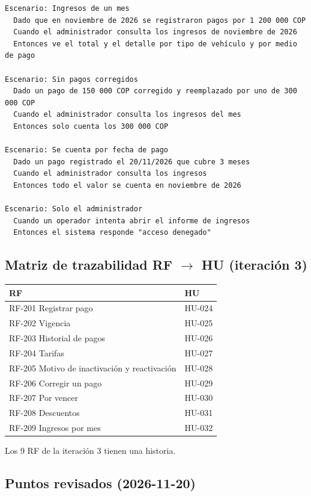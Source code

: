 \begin{lstlisting}[style=gherkin]
Escenario: Ingresos de un mes
  Dado que en noviembre de 2026 se registraron pagos por 1 200 000 COP
  Cuando el administrador consulta los ingresos de noviembre de 2026
  Entonces ve el total y el detalle por tipo de vehículo y por medio de pago

Escenario: Sin pagos corregidos
  Dado un pago de 150 000 COP corregido y reemplazado por uno de 300 000 COP
  Cuando el administrador consulta los ingresos del mes
  Entonces solo cuenta los 300 000 COP

Escenario: Se cuenta por fecha de pago
  Dado un pago registrado el 20/11/2026 que cubre 3 meses
  Cuando el administrador consulta los ingresos
  Entonces todo el valor se cuenta en noviembre de 2026

Escenario: Solo el administrador
  Cuando un operador intenta abrir el informe de ingresos
  Entonces el sistema responde "acceso denegado"
\end{lstlisting}



\subsection{Matriz de trazabilidad RF $\rightarrow$ HU (iteración 3)}

\begin{longtable}{>{\raggedright\arraybackslash}p{11.1cm}>{\raggedright\arraybackslash}p{3.3cm}}
\toprule
\textbf{RF} & \textbf{HU}\\
\midrule\endhead
RF-201 Registrar pago & HU-024\\
RF-202 Vigencia & HU-025\\
RF-203 Historial de pagos & HU-026\\
RF-204 Tarifas & HU-027\\
RF-205 Motivo de inactivación y reactivación & HU-028\\
RF-206 Corregir un pago & HU-029\\
RF-207 Por vencer & HU-030\\
RF-208 Descuentos & HU-031\\
RF-209 Ingresos por mes & HU-032\\
\bottomrule
\end{longtable}


Los 9 RF de la iteración 3 tienen una historia.


\subsection{Puntos revisados (2026-11-20)}

